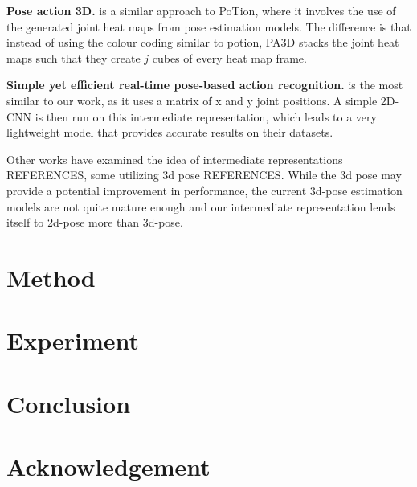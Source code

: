 \documentclass[10pt,twocolumn,letterpaper]{article}
\begin{document}
\textbf{Pose action 3D.} \cite{PA3D} is a similar approach to PoTion, where it involves the use of the generated joint heat maps from pose estimation models. The difference is that instead of using the colour coding similar to potion, PA3D stacks the joint heat maps such that they create $j$ cubes of every heat map frame.

\textbf{Simple yet efficient real-time pose-based action recognition.} \cite{simple_yet_efficient} is the most similar to our work, as it uses a matrix of x and y joint positions. A simple 2D-CNN is then run on this intermediate representation, which leads to a very lightweight model that provides accurate results on their datasets.

Other works have examined the idea of intermediate representations REFERENCES, some utilizing 3d pose REFERENCES. While the 3d pose may provide a potential improvement in performance, the current 3d-pose estimation models are not quite mature enough and our intermediate representation lends itself to 2d-pose more than 3d-pose.

\section{Method}
\label{sec:method}

\section{Experiment}
\label{sec:experiment}

\section{Conclusion}
\label{sec:conclusion}

\section{Acknowledgement}
\label{sec:acknowledgement}

{\small


}
\end{document}
